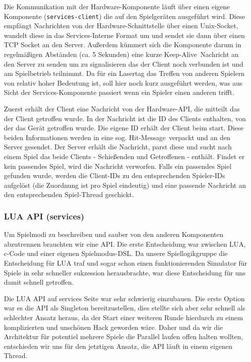 Die Kommunikation mit der Hardware-Komponente läuft über einen eigene Komponente (\texttt{services-client}) die auf den Spielgeräten ausgeführt wird. Diese empfängt Nachrichten von der Hardware-Schnittstelle über einen Unix-Socket, wandelt diese in das Services-Interne Format um und sendet sie dann über einen TCP Socket an den Server. Außerdem kümmert sich die Komponente darum in regelmäßigen Abständen (ca. 5 Sekunden) eine kurze \glqq Keep-Alive\grqq \, Nachricht an den Server zu senden um zu signalisieren das der Client noch verbunden ist und am Spielbetrieb teilnimmt. \newline \newline
Da für ein Lasertag das Treffen von anderen Spielern von relativ hoher Bedeutung ist, soll hier noch kurz ausgeführt werden, was aus Sicht der Services-Komponente passiert wenn ein Spieler einen anderen trifft.

Zuerst erhält der Client eine Nachricht von der Hardware-API, die mitteilt das der Client getroffen wurde. In der Nachricht ist die ID des Clients enthalten, von der das Gerät getroffen wurde. Die eigene ID erhält der Client beim start. Diese beiden Informationen werden in eine sog. \glqq Hit-Message\grqq \, verpackt und an den Server gesendet. 
Der Server erhält die Nachricht, parst diese und sucht nach einem Spiel das beide Clients - Schießenden und Getroffenen - enthält. Findet er kein passendes Spiel, wird die Nachricht verworfen. Falls ein passendes Spiel gefunden wurde, werden die Client-IDs zu den entsprechenden Spieler-IDs aufgelöst (die Zuordnung ist pro Spiel eindeutig) und eine passende Nachricht an den entsprechenden Spiel-Thread geschickt.

\subsubsection{LUA API (services)}

Um Spielmodi zu beschreiben und sauber von den anderen Komponenten abzutrennen brauchten wir eine API. Die erste Entscheidung war zwischen LUA, c-Code und einer eigenen Spielmodus-DSL. Da unsere Spiellogikgruppe die Entscheidung für LUA traf und sogar schon einen funktionierenden Simulator für Spiele in sehr schneller sukzession herausbrachte, war diese Entscheidung für uns damit schnell getroffen.

Die LUA API auf services Seite war sehr schwierig einzubauen. Die erste Option war es die API als Singleton bereitzustellen, dies stellte sich aber sehr schnell als schlechter Ansatz heraus, da der Start einer weiteren Runde hierdurch zu einem komplizierten und unschönen Hack geworden wäre. Daher und da wir die Architektur für potentiel mehrere Spiele die Parallel laufen offen halten wollten, entschieden wir uns für den jetztigen Ansatz, die API läuft in einem eigenen Thread. 

